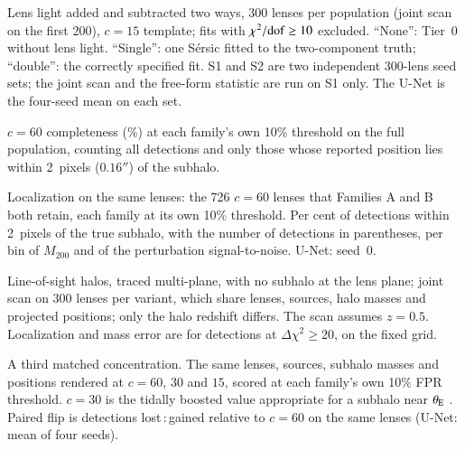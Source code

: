 \documentclass[a4paper,10pt]{article}
\newcommand{\thetaE}{\theta_{\rm E}}
\newcommand{\dchi}{\Delta\chi^2}
\begin{document}
\clearpage

\begin{table}[!htbp]
\caption{Lens light added and subtracted two ways, 300 lenses per population (joint scan on the first 200), $c=15$ template; fits with $\chi^2/{\rm dof}\ge10$ excluded. ``None'': Tier~0 without lens light. ``Single'': one S\'ersic fitted to the two-component truth; ``double'': the correctly specified fit. S1 and S2 are two independent 300-lens seed sets; the joint scan and the free-form statistic are run on S1 only. The U-Net is the four-seed mean on each set.}
\label{tab:lenslight}
\centering
\footnotesize
\setlength{\tabcolsep}{5pt}

\end{table}

\clearpage

\begin{table}[!htbp]
\caption{$c=60$ completeness (\%) at each family's own 10\% threshold on the full population, counting all detections and only those whose reported position lies within 2~pixels ($0.16''$) of the subhalo.}
\label{tab:loccomp}
\centering
\footnotesize

\end{table}

\clearpage

\begin{table}[!htbp]
\caption{Localization on the same lenses: the 726 $c=60$ lenses that Families A and B both retain, each family at its own 10\% threshold. Per cent of detections within 2~pixels of the true subhalo, with the number of detections in parentheses, per bin of $M_{200}$ and of the perturbation signal-to-noise. U-Net: seed~0.}
\label{tab:locmatched}
\centering
\scriptsize
\setlength{\tabcolsep}{2.5pt}

\end{table}

\clearpage

\begin{table}[!htbp]
\caption{Line-of-sight halos, traced multi-plane, with no subhalo at the lens plane; joint scan on 300 lenses per variant, which share lenses, sources, halo masses and projected positions; only the halo redshift differs. The scan assumes $z=0.5$. Localization and mass error are for detections at $\dchi\ge20$, on the fixed grid.}
\label{tab:los}
\centering
\footnotesize
\setlength{\tabcolsep}{3pt}

\end{table}

\clearpage

\begin{table}[!htbp]
\caption{A third matched concentration. The same lenses, sources, subhalo masses and positions rendered at $c=60$, $30$ and $15$, scored at each family's own 10\% FPR threshold. $c=30$ is the tidally boosted value appropriate for a subhalo near $\thetaE$ \citep{moline2017}. Paired flip is detections lost\,:\,gained relative to $c=60$ on the same lenses (U-Net: mean of four seeds).}
\label{tab:c30}
\centering
\footnotesize
\setlength{\tabcolsep}{4pt}

\end{table}
\end{document}
